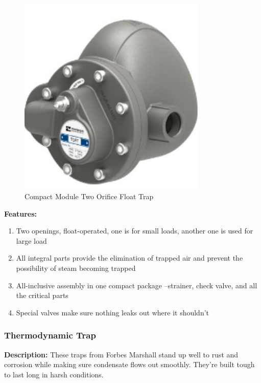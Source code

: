\begin{figure}[h]
    \centering
    \includegraphics[width=0.8\textwidth,height=0.33\textheight,keepaspectratio]{figs/lastmin/two_orific_float_trap.png}
    \caption{Compact Module Two Orifice Float Trap}
    \label{fig:compact_module_two_orifice_float_trap}
\end{figure}

\textbf{Features:}
\begin{enumerate}
    \item Two openings, float-operated, one is for small loads, another one is used for large load
    \item All integral parts provide the elimination of trapped air and prevent the possibility of steam becoming trapped
    \item All-inclusive assembly in one compact package –strainer, check valve, and all the critical parts
    \item Special valves make sure nothing leaks out where it shouldn't
\end{enumerate}

\subsubsection{Thermodynamic Trap}
\textbf{Description:} These traps from Forbes Marshall stand up well to rust and corrosion while making sure condensate flows out smoothly. They’re built tough to last long in harsh conditions.

